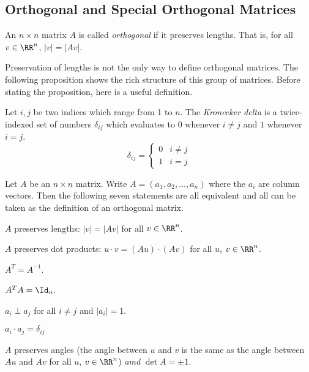 \documentclass[fleqn]{report}
\begin{document}
\subsection{Orthogonal and Special Orthogonal Matrices}
\label{orthogonal-matrices}

\begin{defn}
An $n \times n$ matrix $A$ is called \emph{orthogonal} if it
preserves lengths. That is, for all $v \in \RR^n$, $|v| =
|Av|$. 
\end{defn}

Preservation of lengths is not the only way to define
orthogonal matrices. The following proposition shows the rich
structure of this group of matrices. Before
stating the proposition, here is a useful definition.

\begin{defn}
Let $i,j$ be two indices which range from 1 to $n$. The
\emph{Kronecker delta} is a twice-indexed set of numbers
$\delta_{ij}$ which evaluates to $0$ whenever $i \neq j$ and
$1$ whenever $i=j$. 
\begin{equation*}
\delta_{ij} = \left\{ \begin{matrix} 
0 & i \neq j \\ 1 & i = j \end{matrix} \right.
\end{equation*}
\end{defn} 

\begin{prop}
Let $A$ be an $n \times n$ matrix. Write $A = (a_1, a_2,
\ldots, a_n)$ where the $a_i$ are column vectors. Then the
following seven statements are all equivalent and all can be
taken as the definition of an orthogonal matrix.
\begin{smallparts}
\item $A$ preserves lengths: $|v| = |Av|$ for all $v
\in \RR^n$.
\item $A$ preserves dot products: $u\cdot v = (Au)
\cdot (Av)$ for all $u$, $v \in \RR^n$.
\item $A^T = A^{-1}$.
\item $A^TA = \Id_n$.
\item $a_i \perp a_j$ for all $i \neq j$ and $|a_i| = 1$.
\item $a_i \cdot a_j = \delta_{ij}$
\item $A$ preserves angles (the angle between $u$ and
$v$ is the same as the angle between $Au$ and $Av$ for all
$u$, $v \in \RR^n$) \emph{amd} $\det A = \pm 1$.
\end{smallparts}
\end{prop}
\end{document}
